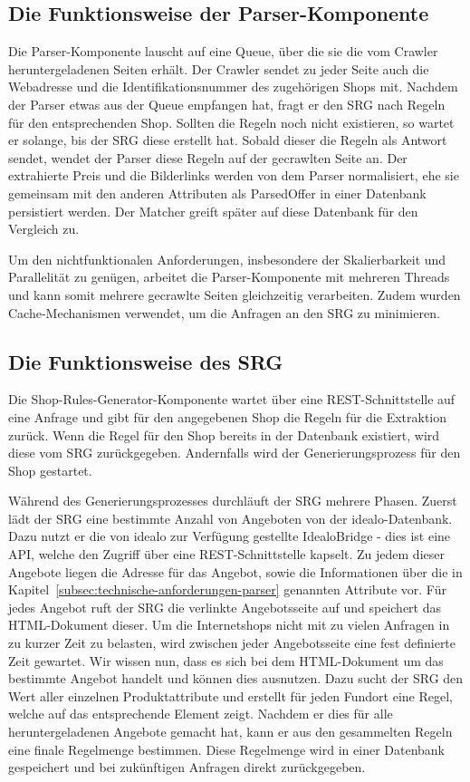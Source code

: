 \subsection{Die Funktionsweise der Parser-Komponente}
\label{subsec:funktionsweise-parser}

Die Parser-Komponente lauscht auf eine Queue, über die sie die vom Crawler heruntergeladenen Seiten erhält.
Der Crawler sendet zu jeder Seite auch die Webadresse und die Identifikationsnummer des zugehörigen Shops mit.
Nachdem der Parser etwas aus der Queue empfangen hat, fragt er den SRG nach Regeln für den entsprechenden Shop.
Sollten die Regeln noch nicht existieren, so wartet er solange, bis der SRG diese erstellt hat.
Sobald dieser die Regeln als Antwort sendet, wendet der Parser diese Regeln auf der gecrawlten Seite an.
Der extrahierte Preis und die Bilderlinks werden von dem Parser normalisiert, ehe sie gemeinsam mit den anderen
Attributen als ParsedOffer in einer Datenbank persistiert werden.
Der Matcher greift später auf diese Datenbank für den Vergleich zu.

Um den nichtfunktionalen Anforderungen, insbesondere der Skalierbarkeit und Parallelität zu genügen, arbeitet die
Parser-Komponente mit mehreren Threads und kann somit mehrere gecrawlte Seiten gleichzeitig verarbeiten.
Zudem wurden Cache-Mechanismen verwendet, um die Anfragen an den SRG zu minimieren.


\subsection{Die Funktionsweise des SRG}
\label{subsec:funktionsweise-srg}

Die Shop-Rules-Generator-Komponente wartet über eine REST-Schnittstelle auf eine Anfrage und gibt für den angegebenen
Shop die Regeln für die Extraktion zurück.
Wenn die Regel für den Shop bereits in der Datenbank existiert, wird diese vom SRG zurückgegeben.
Andernfalls wird der Generierungsprozess für den Shop gestartet.

Während des Generierungsprozesses durchläuft der SRG mehrere Phasen.
Zuerst lädt der SRG eine bestimmte Anzahl von Angeboten von der idealo-Datenbank.
Dazu nutzt er die von idealo zur Verfügung gestellte IdealoBridge - dies ist eine API, welche den Zugriff über
eine REST-Schnittstelle kapselt.
Zu jedem dieser Angebote liegen die Adresse für das Angebot, sowie die  Informationen über die in
Kapitel~\ref{subsec:technische-anforderungen-parser} genannten Attribute vor.
Für jedes Angebot ruft der SRG die verlinkte Angebotsseite auf und speichert das HTML-Dokument dieser.
Um die Internetshops nicht mit zu vielen Anfragen in zu kurzer Zeit zu belasten, wird zwischen jeder Angebotsseite
eine fest definierte Zeit gewartet.
Wir wissen nun, dass es sich bei dem HTML-Dokument um das bestimmte Angebot handelt und können dies ausnutzen.
Dazu sucht der SRG den Wert aller einzelnen Produktattribute und erstellt für jeden Fundort eine Regel, welche auf
das entsprechende Element zeigt.
Nachdem er dies für alle heruntergeladenen Angebote gemacht hat, kann er aus den gesammelten Regeln eine
finale Regelmenge bestimmen.
Diese Regelmenge wird in einer Datenbank gespeichert und bei zukünftigen Anfragen direkt zurückgegeben.

